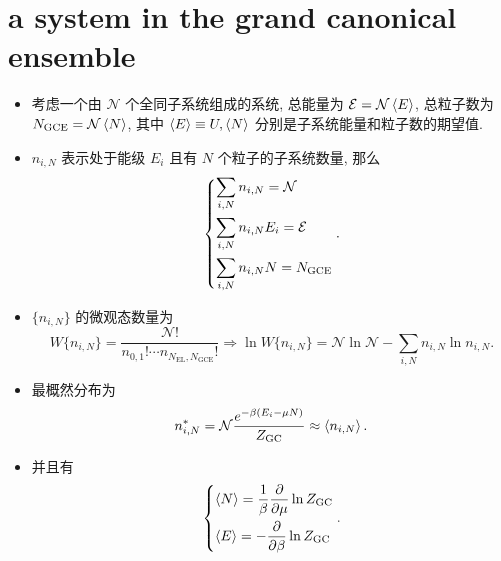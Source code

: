 \section{a system in the grand canonical ensemble}
\begin{itemize}
	\item 考虑一个由 $\mathcal{N}$ 个全同子系统组成的系统, 总能量为 $\mathcal{E} = \mathcal{N} \braket{E}$, 总粒子数为 $N_\text{GCE} = \mathcal{N} \braket{N}$, 其中 $\braket{E} \equiv U, \braket{N}$ 分别是子系统能量和粒子数的期望值.
	
	\item $n_{i, N}$ 表示处于能级 $E_i$ 且有 $N$ 个粒子的子系统数量, 那么
	\begin{equation}
		\begin{dcases}
			\sum_{i, N} n_{i, N} = \mathcal{N} \\
			\sum_{i, N} n_{i, N} E_i = \mathcal{E} \\
			\sum_{i, N} n_{i, N} N = N_\text{GCE}
		\end{dcases}.
	\end{equation}
	
	\item $\{n_{i, N}\}$ 的微观态数量为
	\begin{equation}
		W\{n_{i, N}\} = \frac{\mathcal{N}!}{n_{0, 1}! \cdots n_{N_\text{EL}, N_\text{GCE}}!} \Longrightarrow \ln W\{n_{i, N}\} = \mathcal{N} \ln \mathcal{N} - \sum_{i, N} n_{i, N} \ln n_{i, N}.
	\end{equation}
	
	\item 最概然分布为
	\begin{equation}
		n_{i, N}^* = \mathcal{N} \frac{e^{- \beta (E_i - \mu N)}}{Z_\text{GC}} \approx \braket{n_{i, N}}.
	\end{equation}
	
	\item 并且有
	\begin{equation}
		\begin{dcases}
			\braket{N} = \frac{1}{\beta} \frac{\partial}{\partial \mu} \ln Z_\text{GC} \\
			\braket{E} = - \frac{\partial}{\partial \beta} \ln Z_\text{GC}
		\end{dcases}.
	\end{equation}
\end{itemize}

